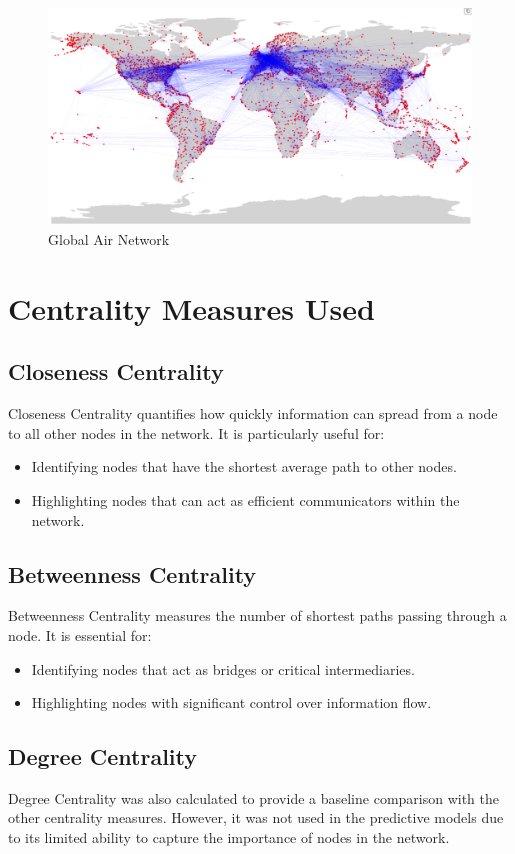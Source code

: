 \documentclass[12pt]{article}
\begin{document}
\begin{figure}[h!]
	\centering
	\includegraphics[width=1\textwidth]{figures/complete.png}
	\caption{Global Air Network}
	\label{fig:air_network}
\end{figure}

\section*{Centrality Measures Used}
\subsection*{Closeness Centrality}
Closeness Centrality quantifies how quickly information can spread from a node to all other nodes in the network. It is particularly useful for:
\begin{itemize}
	\item Identifying nodes that have the shortest average path to other nodes.
	\item Highlighting nodes that can act as efficient communicators within the network.
\end{itemize}

\subsection*{Betweenness Centrality}
Betweenness Centrality measures the number of shortest paths passing through a node. It is essential for:
\begin{itemize}
	\item Identifying nodes that act as bridges or critical intermediaries.
	\item Highlighting nodes with significant control over information flow.
\end{itemize}

\subsection*{Degree Centrality}
Degree Centrality was also calculated to provide a baseline comparison with the other centrality measures. However, it was not used in the predictive models due to its limited ability to capture the importance of nodes in the network.
\end{document}
